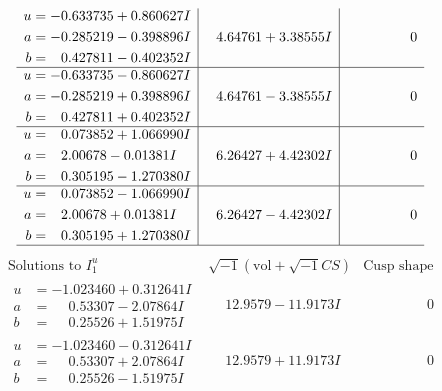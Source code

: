 \documentclass[1p]{elsarticle_modified}
\theoremstyle{definition}
\newcommand{\I}{\sqrt{-1}}
\begin{document}
$$\begin{array}{c|c|c}
\begin{aligned}
u &= -0.633735 + 0.860627 I \\
a &= -0.285219 - 0.398896 I \\
b &= \phantom{-}0.427811 - 0.402352 I\end{aligned}
 & \phantom{-}4.64761 + 3.38555 I & \phantom{-0.000000 } 0 \\ \hline\begin{aligned}
u &= -0.633735 - 0.860627 I \\
a &= -0.285219 + 0.398896 I \\
b &= \phantom{-}0.427811 + 0.402352 I\end{aligned}
 & \phantom{-}4.64761 - 3.38555 I & \phantom{-0.000000 } 0 \\ \hline\begin{aligned}
u &= \phantom{-}0.073852 + 1.066990 I \\
a &= \phantom{-}2.00678 - 0.01381 I \\
b &= \phantom{-}0.305195 - 1.270380 I\end{aligned}
 & \phantom{-}6.26427 + 4.42302 I & \phantom{-0.000000 } 0 \\ \hline\begin{aligned}
u &= \phantom{-}0.073852 - 1.066990 I \\
a &= \phantom{-}2.00678 + 0.01381 I \\
b &= \phantom{-}0.305195 + 1.270380 I\end{aligned}
 & \phantom{-}6.26427 - 4.42302 I & \phantom{-0.000000 } 0\\
 \hline 
 \end{array}$$\newpage$$\begin{array}{c|c|c}  
\text{Solutions to }I^u_{1}& \I (\text{vol} + \sqrt{-1}CS) & \text{Cusp shape}\\
 \hline 
\begin{aligned}
u &= -1.023460 + 0.312641 I \\
a &= \phantom{-}0.53307 - 2.07864 I \\
b &= \phantom{-}0.25526 + 1.51975 I\end{aligned}
 & \phantom{-}12.9579 - 11.9173 I & \phantom{-0.000000 } 0 \\ \hline\begin{aligned}
u &= -1.023460 - 0.312641 I \\
a &= \phantom{-}0.53307 + 2.07864 I \\
b &= \phantom{-}0.25526 - 1.51975 I\end{aligned}
 & \phantom{-}12.9579 + 11.9173 I & \phantom{-0.000000 } 0 \\ \hline\begin{aligned}

\end{aligned}
\end{array}$$
\end{document}
